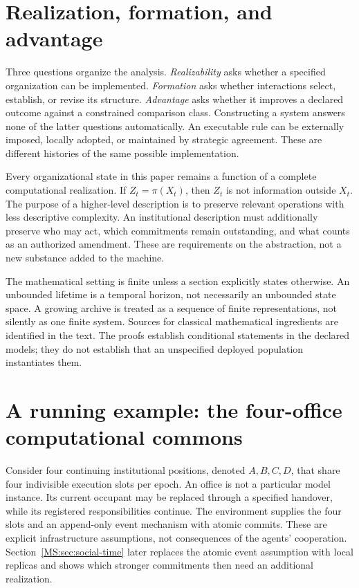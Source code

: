 \section{Realization, formation, and advantage}\label{MS:sec:scope}
Three questions organize the analysis. \emph{Realizability} asks whether a specified organization can be implemented. \emph{Formation} asks whether interactions select, establish, or revise its structure. \emph{Advantage} asks whether it improves a declared outcome against a constrained comparison class. Constructing a system answers none of the latter questions automatically. An executable rule can be externally imposed, locally adopted, or maintained by strategic agreement. These are different histories of the same possible implementation.

Every organizational state in this paper remains a function of a complete computational realization. If $Z_t=\pi(X_t)$, then $Z_t$ is not information outside $X_t$. The purpose of a higher-level description is to preserve relevant operations with less descriptive complexity. An institutional description must additionally preserve who may act, which commitments remain outstanding, and what counts as an authorized amendment. These are requirements on the abstraction, not a new substance added to the machine.

The mathematical setting is finite unless a section explicitly states otherwise. An unbounded lifetime is a temporal horizon, not necessarily an unbounded state space. A growing archive is treated as a sequence of finite representations, not silently as one finite system. Sources for classical mathematical ingredients are identified in the text. The proofs establish conditional statements in the declared models; they do not establish that an unspecified deployed population instantiates them.


\section{A running example: the four-office computational commons}\label{MS:sec:commons}
Consider four continuing institutional positions, denoted $A,B,C,D$, that share four indivisible execution slots per epoch. An office is not a particular model instance. Its current occupant may be replaced through a specified handover, while its registered responsibilities continue. The environment supplies the four slots and an append-only event mechanism with atomic commits. These are explicit infrastructure assumptions, not consequences of the agents' cooperation. Section~\ref{MS:sec:social-time} later replaces the atomic event assumption with local replicas and shows which stronger commitments then need an additional realization.

